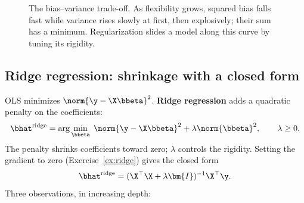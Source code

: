 \begin{figure}[htbp]
\centering
{}
\caption{The bias--variance trade-off. As flexibility grows, squared bias falls fast while variance rises slowly at first, then explosively; their sum has a minimum. Regularization slides a model along this curve by tuning its rigidity.}
\label{fig:ucurve}
\end{figure}

\subsection{Ridge regression: shrinkage with a closed form}

OLS minimizes $\norm{\y - \X\bbeta}^2$. \textbf{Ridge regression} adds a quadratic penalty on the coefficients:
\begin{equation}\label{eq:ridge}
  \bhat^{\mathrm{ridge}} = \arg\min_{\bbeta} \; \norm{\y - \X\bbeta}^2 + \lambda \norm{\bbeta}^2,
  \qquad \lambda \geq 0.
\end{equation}
The penalty shrinks coefficients toward zero; $\lambda$ controls the rigidity. Setting the gradient to zero (Exercise~\ref{ex:ridge}) gives the closed form
\begin{equation}\label{eq:ridge-sol}
  \bhat^{\mathrm{ridge}} = (\X^\top \X + \lambda \bm{I})^{-1} \X^\top \y.
\end{equation}
Three observations, in increasing depth:

